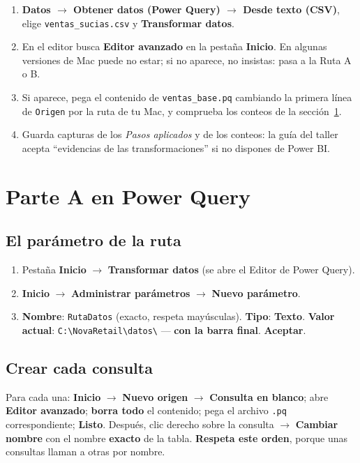 \documentclass[11pt,letterpaper]{article}
\newcommand{\bs}{\textbackslash}
\newcommand{\ui}[1]{\textbf{#1}}                 %
\begin{document}
\begin{enumerate}
  \item \ui{Datos $\rightarrow$ Obtener datos (Power Query) $\rightarrow$ Desde texto (CSV)}, elige \texttt{ventas\_sucias.csv} y \ui{Transformar datos}.
  \item En el editor busca \ui{Editor avanzado} en la pestaña \ui{Inicio}. En algunas versiones de Mac puede no estar; si no aparece, no insistas: pasa a la Ruta A o B.
  \item Si aparece, pega el contenido de \texttt{ventas\_base.pq} cambiando la primera línea de \texttt{Origen} por la ruta de tu Mac, y comprueba los conteos de la sección~\ref{sec:parte-a}.
  \item Guarda capturas de los \emph{Pasos aplicados} y de los conteos: la guía del taller acepta ``evidencias de las transformaciones'' si no dispones de Power BI.
\end{enumerate}

\section{Parte A en Power Query}
\label{sec:parte-a}

\subsection{El parámetro de la ruta}
\label{sec:parametro}

\begin{enumerate}
  \item Pestaña \ui{Inicio} $\rightarrow$ \ui{Transformar datos} (se abre el Editor de Power Query).
  \item \ui{Inicio} $\rightarrow$ \ui{Administrar parámetros} $\rightarrow$ \ui{Nuevo parámetro}.
  \item \ui{Nombre}: \texttt{RutaDatos} (exacto, respeta mayúsculas). \ui{Tipo}: \ui{Texto}. \ui{Valor actual}: \texttt{C:\bs NovaRetail\bs datos\bs}
        --- \textbf{con la barra final}. \ui{Aceptar}.
\end{enumerate}

\subsection{Crear cada consulta}

Para cada una: \ui{Inicio} $\rightarrow$ \ui{Nuevo origen} $\rightarrow$ \ui{Consulta en blanco}; abre \ui{Editor avanzado};
\textbf{borra todo} el contenido; pega el archivo \texttt{.pq} correspondiente; \ui{Listo}. Después, clic derecho sobre la consulta
$\rightarrow$ \ui{Cambiar nombre} con el nombre \textbf{exacto} de la tabla. \textbf{Respeta este orden}, porque unas consultas llaman a otras por nombre.
\end{document}
